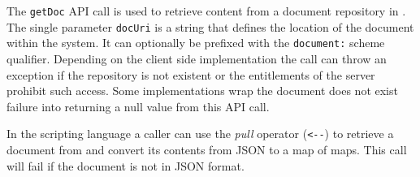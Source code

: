 The \verb+getDoc+ API call is used to retrieve content from a document repository
in \Rapture. The single parameter \verb+docUri+ is a string that defines the
location of the document within the \Rapture system. It can optionally be
prefixed with the \verb+document:+ scheme qualifier. Depending on the client
side implementation the call can throw an exception if the repository is not
existent or the entitlements of the server prohibit such access. Some implementations
wrap the document does not exist failure into returning a null value from this
API call.

In the \Reflex scripting language a caller can use the \emph{pull} operator (\verb+<--+)
to retrieve a document from \Rapture and convert its contents from JSON to a \Reflex map
of maps. This call will fail if the document is not in JSON format.
